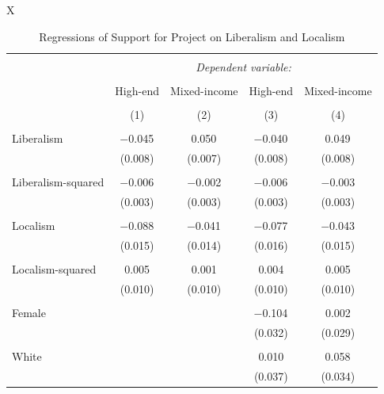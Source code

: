 \documentclass[article,12pt]{memoir}
\begin{document}
\begin{SingleSpacing}
\begin{table}
  \caption{Regressions of Support for Project on Liberalism and Localism}
  \label{tab:hg_e_support_regression}
  \begin{threeparttable}
  \scriptsize
  \begin{tabularx}{\linewidth}{X}
  \centering

  \begin{tabular}{@{\extracolsep{5pt}}lcccc} 
  \\[-1.8ex]\hline 
  \hline \\[-1.8ex] 
   & \multicolumn{4}{c}{\textit{Dependent variable:}} \\ 
  \cline{2-5} 
  \\[-1.8ex] & High-end & Mixed-income & High-end & Mixed-income\\ 
  \\[-1.8ex] & (1) & (2) & (3) & (4)\\ 
  \hline \\[-1.8ex] 
   Liberalism & $-$0.045$^{}$ & 0.050$^{}$ & $-$0.040$^{}$ & 0.049$^{}$ \\ 
    & (0.008) & (0.007) & (0.008) & (0.008) \\ 
    & & & & \\ 
   Liberalism-squared & $-$0.006$^{}$ & $-$0.002 & $-$0.006$^{}$ & $-$0.003 \\ 
    & (0.003) & (0.003) & (0.003) & (0.003) \\ 
    & & & & \\ 
   Localism & $-$0.088$^{}$ & $-$0.041$^{}$ & $-$0.077$^{}$ & $-$0.043$^{}$ \\ 
    & (0.015) & (0.014) & (0.016) & (0.015) \\ 
    & & & & \\ 
   Localism-squared & 0.005 & 0.001 & 0.004 & 0.005 \\ 
    & (0.010) & (0.010) & (0.010) & (0.010) \\ 
    & & & & \\ 
   Female &  &  & $-$0.104$^{}$ & 0.002 \\ 
    &  &  & (0.032) & (0.029) \\ 
    & & & & \\ 
   White &  &  & 0.010 & 0.058$^{}$ \\ 
    &  &  & (0.037) & (0.034) \\ 

\end{tabular}
\end{tabularx}
\end{threeparttable}
\end{table}
\end{SingleSpacing}
\end{document}
